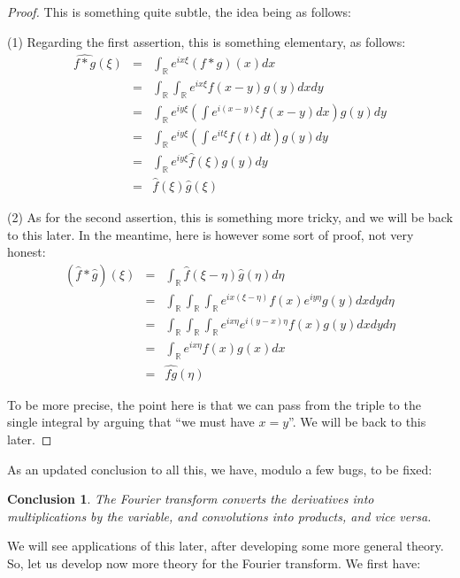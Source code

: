 \documentclass[12pt]{amsbook}
\newtheorem{conclusion}[theorem]{Conclusion}
\begin{document}
\begin{proof}
This is something quite subtle, the idea being as follows:

\medskip

(1) Regarding the first assertion, this is something elementary, as follows:
\begin{eqnarray*}
\widehat{f*g}(\xi)
&=&\int_\mathbb R e^{ix\xi}(f*g)(x)dx\\
&=&\int_\mathbb R\int_\mathbb R e^{ix\xi}f(x-y)g(y)dxdy\\
&=&\int_\mathbb R e^{iy\xi}\left(\int e^{i(x-y)\xi}f(x-y)dx\right)g(y)dy\\
&=&\int_\mathbb R e^{iy\xi}\left(\int e^{it\xi}f(t)dt\right)g(y)dy\\
&=&\int_\mathbb R e^{iy\xi}\widehat{f}(\xi)g(y)dy\\
&=&\widehat{f}(\xi)\widehat{g}(\xi)
\end{eqnarray*}

(2) As for the second assertion, this is something more tricky, and we will be back to this later. In the meantime, here is however some sort of proof, not very honest:
\begin{eqnarray*}
(\widehat{f}*\widehat{g})(\xi)
&=&\int_\mathbb R\widehat{f}(\xi-\eta)\widehat{g}(\eta)d\eta\\
&=&\int_\mathbb R\int_\mathbb R\int_\mathbb R e^{ix(\xi-\eta)}f(x)e^{iy\eta}g(y)dxdyd\eta\\
&=&\int_\mathbb R\int_\mathbb R\int_\mathbb R e^{ix\eta}e^{i(y-x)\eta}f(x)g(y)dxdyd\eta\\
&=&\int_\mathbb R e^{ix\eta}f(x)g(x)dx\\
&=&\widehat{fg}(\eta)
\end{eqnarray*}

To be more precise, the point here is that we can pass from the triple to the single integral by arguing that ``we must have $x=y$''. We will be back to this later.
\end{proof}

As an updated conclusion to all this, we have, modulo a few bugs, to be fixed:

\begin{conclusion}
The Fourier transform converts the derivatives into multiplications by the variable, and convolutions into products, and vice versa.
\end{conclusion}

We will see applications of this later, after developing some more general theory. So, let us develop now more theory for the Fourier transform. We first have:
\end{document}
